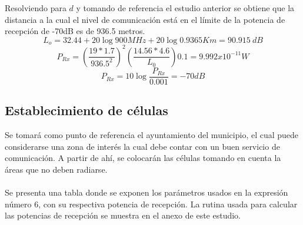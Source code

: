 \documentclass[11pt,letterpaper]{article}
\begin{document}
\newpage
Resolviendo para $d$ y tomando de referencia el estudio anterior se obtiene que la distancia 
a la cual el nivel de comunicación está en el límite de la potencia de recepción de -70dB es 
de 936.5 metros.
\begin{equation}
    L_o=32.44+20\log{900MHz}+20\log{0.9365 Km}=90.915 \ dB
\end{equation}
\begin{equation}
    P_{Rx}=(\frac{19*1.7}{936.5^2})^2 (\frac{14.56*4.6}{L_0}) 0.1=9.992x10^{-11} W
\end{equation}
\begin{equation}
    P_{Rx}=10\log{\frac{P_{Rx}}{0.001}}=-70dB
\end{equation}

\newpage
\subsection{Establecimiento de células}
Se tomará como punto de referencia el ayuntamiento del municipio, el cual puede considerarse 
una zona de interés la cual debe contar con un buen servicio de comunicación. A partir de 
ahí, se colocarán las células tomando en cuenta la áreas que no deben radiarse.
\\ \\ 
Se presenta una tabla donde se exponen los parámetros usados en la expresión número 6, con 
su respectiva potencia de recepción. La rutina usada para calcular las potencias de 
recepción se muestra en el anexo de este estudio. 
\end{document}
